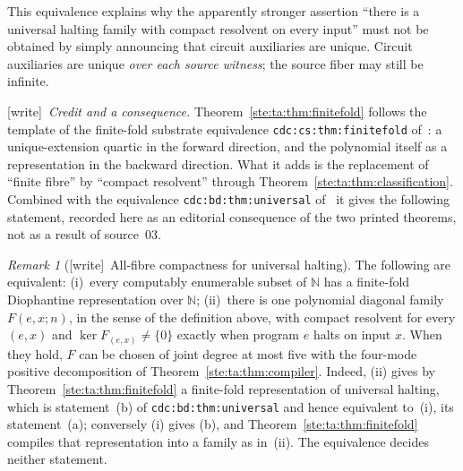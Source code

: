 \documentclass[11pt,letterpaper]{article}
\theoremstyle{definition}
\theoremstyle{remark}
\newtheorem{remark}[theorem]{Remark}
\newcommand{\N}{\mathbb N}
\newcommand{\wtag}{\textup{[write]}}
\begin{document}
This equivalence explains why the apparently stronger assertion ``there is a universal halting family with compact resolvent on every input'' must not be obtained by simply announcing that circuit auxiliaries are unique. Circuit auxiliaries are unique \emph{over each source witness}; the source fiber may still be infinite.

\wtag\ \emph{Credit and a consequence.} Theorem~\ref{ste:ta:thm:finitefold} follows the template of the finite-fold substrate equivalence \texttt{cdc:cs:thm:finitefold} of~\cite{cdc}: a unique-extension quartic in the forward direction, and the polynomial itself as a representation in the backward direction. What it adds is the replacement of ``finite fibre'' by ``compact resolvent'' through Theorem~\ref{ste:ta:thm:classification}. Combined with the equivalence \texttt{cdc:bd:thm:universal} of~\cite{cdc} it gives the following statement, recorded here as an editorial consequence of the two printed theorems, not as a result of source~03.

\begin{remark}[\wtag\ All-fibre compactness for universal halting]\label{ste:ta:rem:universalcompact}
The following are equivalent: (i)~every computably enumerable subset of $\N$ has a finite-fold Diophantine representation over $\N$; (ii)~there is one polynomial diagonal family $F(e,x;n)$, in the sense of the definition above, with compact resolvent for every $(e,x)$ and $\ker F_{(e,x)}\ne\{0\}$ exactly when program $e$ halts on input $x$. When they hold, $F$ can be chosen of joint degree at most five with the four-mode positive decomposition of Theorem~\ref{ste:ta:thm:compiler}. Indeed, (ii) gives by Theorem~\ref{ste:ta:thm:finitefold} a finite-fold representation of universal halting, which is statement~(b) of \texttt{cdc:bd:thm:universal} and hence equivalent to~(i), its statement~(a); conversely (i) gives (b), and Theorem~\ref{ste:ta:thm:finitefold} compiles that representation into a family as in~(ii). The equivalence decides neither statement.
\end{remark}
\end{document}
